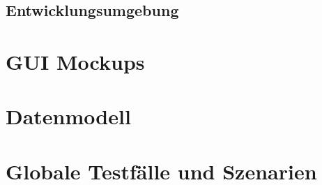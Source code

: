 \documentclass[a4paper,12pt]{article}
\begin{document}
\subsection{Entwicklungsumgebung}


\section{GUI Mockups}

\section{Datenmodell}

\section{Globale Testfälle und Szenarien}

\clearpage

\end{document}
